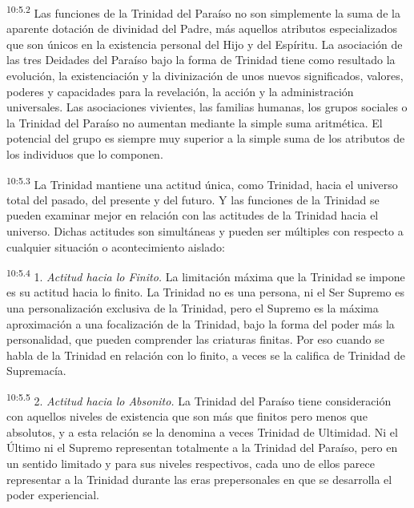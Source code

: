 \par
\textsuperscript{10:5.2} Las funciones de la Trinidad del Paraíso no son simplemente la suma de la aparente dotación de divinidad del Padre, más aquellos atributos especializados que son únicos en la existencia personal del Hijo y del Espíritu. La asociación de las tres Deidades del Paraíso bajo la forma de Trinidad tiene como resultado la evolución, la existenciación y la divinización de unos nuevos significados, valores, poderes y capacidades para la revelación, la acción y la administración universales. Las asociaciones vivientes, las familias humanas, los grupos sociales o la Trinidad del Paraíso no aumentan mediante la simple suma aritmética. El potencial del grupo es siempre muy superior a la simple suma de los atributos de los individuos que lo componen.

\par
\textsuperscript{10:5.3} La Trinidad mantiene una actitud única, como Trinidad, hacia el universo total del pasado, del presente y del futuro. Y las funciones de la Trinidad se pueden examinar mejor en relación con las actitudes de la Trinidad hacia el universo. Dichas actitudes son simultáneas y pueden ser múltiples con respecto a cualquier situación o acontecimiento aislado:

\par
\textsuperscript{10:5.4} 1. \textit{Actitud hacia lo Finito.} La limitación máxima que la Trinidad se impone es su actitud hacia lo finito. La Trinidad no es una persona, ni el Ser Supremo es una personalización exclusiva de la Trinidad, pero el Supremo es la máxima aproximación a una focalización de la Trinidad, bajo la forma del poder más la personalidad, que pueden comprender las criaturas finitas. Por eso cuando se habla de la Trinidad en relación con lo finito, a veces se la califica de Trinidad de Supremacía.

\par
\textsuperscript{10:5.5} 2. \textit{Actitud hacia lo Absonito.} La Trinidad del Paraíso tiene consideración con aquellos niveles de existencia que son más que finitos pero menos que absolutos, y a esta relación se la denomina a veces Trinidad de Ultimidad. Ni el Último ni el Supremo representan totalmente a la Trinidad del Paraíso, pero en un sentido limitado y para sus niveles respectivos, cada uno de ellos parece representar a la Trinidad durante las eras prepersonales en que se desarrolla el poder experiencial.

